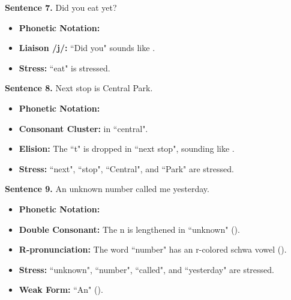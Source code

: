 \begin{description}
    \item \textbf{Sentence 7.} Did you eat yet?
    \begin{itemize}
        \item \textbf{Phonetic Notation:} 
        \item \textbf{Liaison /j/:} ``Did you" sounds like .
        \item \textbf{Stress:} ``eat" is stressed.
    \end{itemize}

    \item \textbf{Sentence 8.} Next stop is Central Park.
    \begin{itemize}
        \item \textbf{Phonetic Notation:}  
        \item \textbf{Consonant Cluster:}  in ``central".
        \item \textbf{Elision:} The ``t" is dropped in ``next stop", sounding like .
        \item \textbf{Stress:} ``next", ``stop", ``Central", and ``Park" are stressed.
    \end{itemize}

    \item \textbf{Sentence 9.} An unknown number called me yesterday.
    \begin{itemize}
        \item \textbf{Phonetic Notation:} 
        \item \textbf{Double Consonant:} The n is lengthened in ``unknown" ().
        \item \textbf{R-pronunciation:} The word ``number" has an r-colored schwa vowel ().
        \item \textbf{Stress:} ``unknown", ``number", ``called", and ``yesterday" are stressed.
        \item \textbf{Weak Form:} ``An" ().
    \end{itemize}


\end{description}
